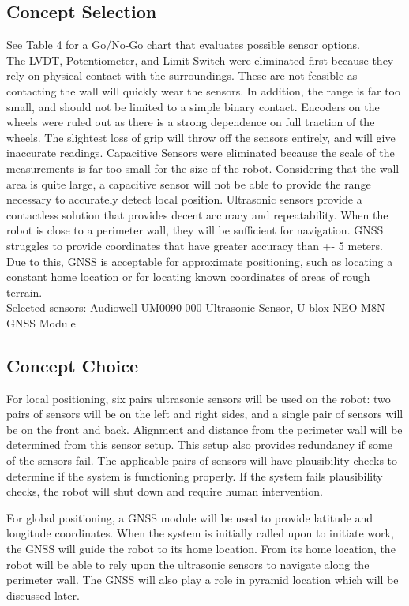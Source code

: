 \documentclass[12pt]{article}
\begin{document}
\subsection{Concept Selection}

See Table 4 for a Go/No-Go chart that evaluates possible sensor options.\\
The LVDT, Potentiometer, and Limit Switch were eliminated first because they rely on physical contact with the surroundings. These are not feasible as contacting the wall will quickly wear the sensors. In addition, the range is far too small, and should not be limited to a simple binary contact.
Encoders on the wheels were ruled out as there is a strong dependence on full traction of the wheels. The slightest loss of grip will throw off the sensors entirely, and will give inaccurate readings.
Capacitive Sensors were eliminated because the scale of the measurements is far too small for the size of the robot. Considering that the wall area is quite large, a capacitive sensor will not be able to provide the range necessary to accurately detect local position.
Ultrasonic sensors provide a contactless solution that provides decent accuracy and repeatability. When the robot is close to a perimeter wall, they will be sufficient for navigation.
GNSS struggles to provide coordinates that have greater accuracy than +- 5 meters. Due to this, GNSS is acceptable for approximate positioning, such as locating a constant home location or for locating known coordinates of areas of rough terrain. \\

Selected sensors: Audiowell UM0090-000 Ultrasonic Sensor, U-blox NEO-M8N GNSS Module

\subsection{Concept Choice}
For local positioning, six pairs ultrasonic sensors will be used on the robot: two pairs of sensors will be on the left and right sides, and a single pair of sensors will be on the front and back. Alignment and distance from the perimeter wall will be determined from this sensor setup. This setup also provides redundancy if some of the sensors fail. The applicable pairs of sensors will have plausibility checks to determine if the system is functioning properly. If the system fails plausibility checks, the robot will shut down and require human intervention.

For global positioning, a GNSS module will be used to provide latitude and longitude coordinates. When the system is initially called upon to initiate work, the GNSS will guide the robot to its home location. From its home location, the robot will be able to rely upon the ultrasonic sensors to navigate along the perimeter wall. The GNSS will also play a role in pyramid location which will be discussed later. 
\end{document}
